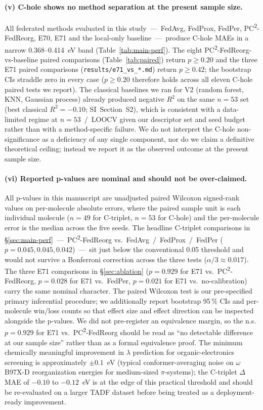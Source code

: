 \documentclass[11pt,a4paper]{article}
\newcommand{\PC}{PC\textsuperscript{2}-FedReorg}
\begin{document}
\paragraph{(v) C-hole shows no method separation at the present sample size.} All federated methods evaluated in this study~---~FedAvg, FedProx, FedPer, \PC{}, E70, E71 and the local-only baseline~---~produce C-hole MAEs in a narrow \SI{0.368}{}--\SI{0.414}{\eV} band (Table~\ref{tab:main-perf}). The eight \PC{}-vs-baseline paired comparisons (Table~\ref{tab:paired}) return $p \ge 0.20$ and the three E71 paired comparisons (\texttt{results/e71\_vs\_*.md}) return $p \ge 0.42$; the bootstrap CIs straddle zero in every case ($p \ge 0.20$ therefore holds across all eleven C-hole paired tests we report). The classical baselines we ran for V2 (random forest, KNN, Gaussian process) already produced negative $R^2$ on the same $n = 53$ set (best classical $R^2 = -0.10$; SI~Section~S2), which is consistent with a data-limited regime at $n = 53$~/~LOOCV given our descriptor set and seed budget rather than with a method-specific failure. We do not interpret the C-hole non-significance as a deficiency of any single component, nor do we claim a definitive theoretical ceiling; instead we report it as the observed outcome at the present sample size.

\paragraph{(vi) Reported p-values are nominal and should not be over-claimed.} All p-values in this manuscript are unadjusted paired Wilcoxon signed-rank values on per-molecule absolute errors, where the paired sample unit is each individual molecule ($n = 49$ for C-triplet, $n = 53$ for C-hole) and the per-molecule error is the median across the five seeds. The headline C-triplet comparisons in \S\ref{sec:main-perf}~---~\PC{} vs.\ FedAvg~/~FedProx~/~FedPer ($p = 0.045, 0.045, 0.042$)~---~sit just below the conventional 0.05 threshold and would not survive a Bonferroni correction across the three tests ($\alpha/3 \approx 0.017$). The three E71 comparisons in \S\ref{sec:ablation} ($p = 0.929$ for E71 vs.\ \PC{}, $p = 0.028$ for E71 vs.\ FedPer, $p = 0.021$ for E71 vs.\ no-calibration) carry the same nominal character. The paired Wilcoxon test is our pre-specified primary inferential procedure; we additionally report bootstrap 95\,\% CIs and per-molecule win/loss counts so that effect size and effect direction can be inspected alongside the p-values. We did not pre-register an equivalence margin, so the n.s. $p = 0.929$ for E71 vs.\ \PC{} should be read as ``no detectable difference at our sample size'' rather than as a formal equivalence proof. The minimum chemically meaningful improvement in $\lambda$ prediction for organic-electronics screening is approximately $\pm 0.1$~eV (typical conformer-averaging noise on $\omega$B97X-D reorganization energies for medium-sized $\pi$-systems); the C-triplet $\Delta$MAE of $-0.10$ to $-0.12$~eV is at the edge of this practical threshold and should be re-evaluated on a larger TADF dataset before being treated as a deployment-ready improvement.
\end{document}
